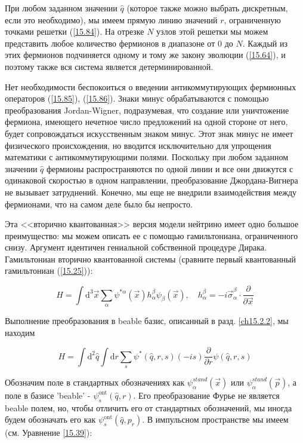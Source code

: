 \documentclass[main.tex]{subfiles}
\begin{document}
При любом заданном значении $\hat q$ (которое также можно выбрать дискретным, если это необходимо), мы имеем прямую линию значений $r$, ограниченную точками решетки (\ref{15.84}). На отрезке $N$ узлов этой решетки мы можем представить любое количество фермионов в диапазоне от 0 до $N$. Каждый из этих фермионов подчиняется одному и тому же закону эволюции (\ref{15.64}), и поэтому также вся система является детерминированной.

Нет необходимости беспокоиться о введении антикоммутирующих фермионных операторов (\ref{15.85}), (\ref{15.86}). Знаки минус обрабатываются с помощью преобразования Jordan-Wigner, подразумевая, что создание или уничтожение фермиона, имеющего нечетное число предложений на одной стороне от него, будет сопровождаться искусственным знаком минус. Этот знак минус не имеет физического происхождения, но вводится исключительно для упрощения математики с антикоммутирующими полями. Поскольку при любом заданном значении $\hat q$ фермионы распространяются по одной линии и все они движутся с одинаковой скоростью в одном направлении, преобразование Джордана-Вигнера не вызывает затруднений. Конечно, мы еще не внедрили взаимодействия между фермионами, что на самом деле было бы непросто.

Эта <<вторично квантованная>> версия модели нейтрино имеет одно большое преимущество: мы можем описать ее с помощью гамильтониана, ограниченного снизу. Аргумент идентичен гениальной собственной процедуре Дирака. Гамильтониан вторично квантованной системы (сравните первый квантованный гамильтониан (\ref{15.25})):

\begin{equation}\label{15.87}
	H=\int \mathrm{d}^{3} \vec{x} \sum_{\alpha} \psi^{* \alpha}(\vec{x}) h_{\alpha}^{\beta} \psi_{\beta}(\vec{x}), \quad h_{\alpha}^{\beta}=-i \vec{\sigma}_{\alpha}^{\beta} \cdot \frac{\partial}{\partial \vec{x}}
\end{equation}
                        
Выполнение преобразования в beable базис, описанный в разд. \ref{ch15.2.2}, мы находим 

\begin{equation}\label{15.88}
	H=\int \mathrm{d}^{2} \hat{q} \int \mathrm{d} r \sum_{s} \psi^{*}(\hat{q}, r, s)(-i s) \frac{\partial}{\partial r} \psi(\hat{q}, r, s)
\end{equation}

Обозначим поле в стандартных обозначениях как $\psi^{stand}_\alpha(\vec x)$ или $\psi^{stand}_\alpha(\vec p)$, а поле в базисе 'beable' - $\psi^{\text{ont}}_s(\hat q, r)$. Его преобразование Фурье не является beable полем, но, чтобы отличить его от стандартных обозначений, мы иногда будем обозначать его как $\psi^{\text{ont}}_s(\hat q, p_r)$.
В импульсном пространстве мы имеем (см. Уравнение \ref{15.39}):
\end{document}
